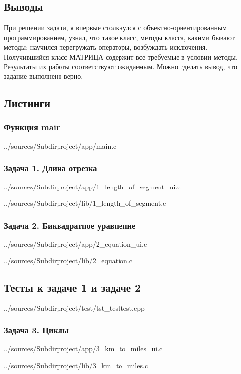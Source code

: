 \documentclass[12pt,a4paper]{report}
\begin{document}
\subsection{Выводы}
При решении задачи, я впервые столкнулся с объектно-ориентированным программированием, узнал, что такое класс, методы класса, какими бывают методы; научился перегружать операторы, возбуждать исключения. Получившийся класс МАТРИЦА содержит все требуемые в условии методы. Результаты их работы соответствуют ожидаемым. Можно сделать вывод, что задание выполнено верно. 
\newpage

\subsection*{Листинги}
\subsubsection{Функция main}

{../sources/Subdirproject/app/main.c}
\newpage

\subsubsection{Задача 1. Длина отрезка}

{../sources/Subdirproject/app/1_length_of_segment_ui.c}


{../sources/Subdirproject/lib/1_length_of_segment.c}
\newpage

\subsubsection{Задача 2. Биквадратное уравнение}

{../sources/Subdirproject/app/2_equation_ui.c}


{../sources/Subdirproject/lib/2_equation.c}
\newpage

\subsection{Тесты к задаче 1 и задаче 2}

{../sources/Subdirproject/test/tst_testtest.cpp}
\newpage

\subsubsection{Задача 3. Циклы}

{../sources/Subdirproject/app/3_km_to_miles_ui.c}


{../sources/Subdirproject/lib/3_km_to_miles.c}
\newpage
\end{document}
